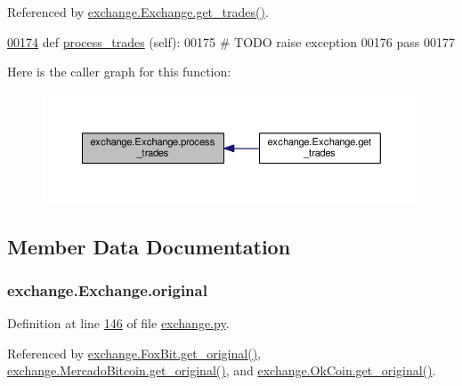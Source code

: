 Referenced by \hyperlink{exchange_8py_source_l00178}{exchange.\+Exchange.\+get\+\_\+trades()}.


\begin{DoxyCode}
\hypertarget{classexchange_1_1_exchange.tex_l00174}{}\hyperlink{classexchange_1_1_exchange_a0e67454c7053807302be914376790484}{00174}     \textcolor{keyword}{def }\hyperlink{classexchange_1_1_exchange_a0e67454c7053807302be914376790484}{process\_trades} (self):
00175         \textcolor{comment}{# TODO raise exception}
00176         \textcolor{keywordflow}{pass}
00177     
\end{DoxyCode}


Here is the caller graph for this function\+:\nopagebreak
\begin{figure}[H]
\begin{center}
\leavevmode
\includegraphics[width=350pt]{classexchange_1_1_exchange_a0e67454c7053807302be914376790484_icgraph}
\end{center}
\end{figure}




\subsection{Member Data Documentation}
\subsubsection[{\texorpdfstring{original}{original}}]{\setlength{\rightskip}{0pt plus 5cm}exchange.\+Exchange.\+original}\hypertarget{classexchange_1_1_exchange_af69daf804599e27f7431632d91b2c3b9}{}\label{classexchange_1_1_exchange_af69daf804599e27f7431632d91b2c3b9}


Definition at line \hyperlink{exchange_8py_source_l00146}{146} of file \hyperlink{exchange_8py_source}{exchange.\+py}.



Referenced by \hyperlink{exchange_8py_source_l00274}{exchange.\+Fox\+Bit.\+get\+\_\+original()}, \hyperlink{exchange_8py_source_l00343}{exchange.\+Mercado\+Bitcoin.\+get\+\_\+original()}, and \hyperlink{exchange_8py_source_l00402}{exchange.\+Ok\+Coin.\+get\+\_\+original()}.

